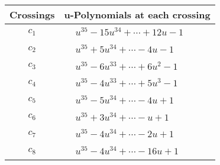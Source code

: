 \documentclass[1p]{elsarticle_modified}
\theoremstyle{definition}
\begin{document}
\begin{tabular}{m{50pt}|m{274pt}}
Crossings & \hspace{64pt}u-Polynomials at each crossing \\
\hline $$\begin{aligned}c_{1}\end{aligned}$$&$\begin{aligned}
&u^{35}-15 u^{34}+\cdots+12 u-1
\end{aligned}$\\
\hline $$\begin{aligned}c_{2}\end{aligned}$$&$\begin{aligned}
&u^{35}+5 u^{34}+\cdots-4 u-1
\end{aligned}$\\
\hline $$\begin{aligned}c_{3}\end{aligned}$$&$\begin{aligned}
&u^{35}-6 u^{33}+\cdots+6 u^2-1
\end{aligned}$\\
\hline $$\begin{aligned}c_{4}\end{aligned}$$&$\begin{aligned}
&u^{35}-4 u^{33}+\cdots+5 u^3-1
\end{aligned}$\\
\hline $$\begin{aligned}c_{5}\end{aligned}$$&$\begin{aligned}
&u^{35}-5 u^{34}+\cdots-4 u+1
\end{aligned}$\\
\hline $$\begin{aligned}c_{6}\end{aligned}$$&$\begin{aligned}
&u^{35}+3 u^{34}+\cdots- u+1
\end{aligned}$\\
\hline $$\begin{aligned}c_{7}\end{aligned}$$&$\begin{aligned}
&u^{35}-4 u^{34}+\cdots-2 u+1
\end{aligned}$\\
\hline $$\begin{aligned}c_{8}\end{aligned}$$&$\begin{aligned}
&u^{35}-4 u^{34}+\cdots-16 u+1
\end{aligned}$\\

\end{tabular}
\end{document}
